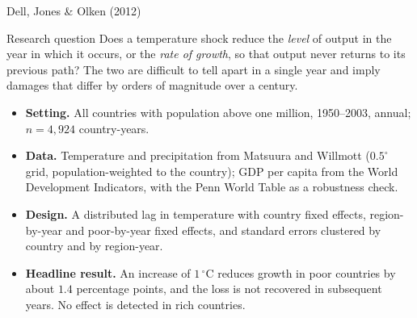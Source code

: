 \documentclass[aspectratio=169,10pt]{beamer}
\begin{document}
\begin{frame}{Dell, Jones \& Olken (2012)}
  \begin{block}{Research question}
    \small Does a temperature shock reduce the \emph{level} of output in the year in
    which it occurs, or the \emph{rate of growth}, so that output never returns to
    its previous path? The two are difficult to tell apart in a single year and
    imply damages that differ by orders of magnitude over a century.
  \end{block}
  \vspace{2pt}
  \small
  \begin{itemize}
    \item \textbf{Setting.} All countries with population above one million,
          1950--2003, annual; $n = 4{,}924$ country-years.
    \item \textbf{Data.} Temperature and precipitation from Matsuura and Willmott
          ($0.5^\circ$ grid, population-weighted to the country); GDP per capita from
          the World Development Indicators, with the Penn World Table as a
          robustness check.
    \item \textbf{Design.} A distributed lag in temperature with country fixed
          effects, region-by-year and poor-by-year fixed effects, and standard errors
          clustered by country and by region-year.
    \item \textbf{Headline result.} An increase of $1\,^\circ$C reduces growth in
          poor countries by about $1.4$ percentage points, and the loss is not
          recovered in subsequent years. No effect is detected in rich countries.
  \end{itemize}
\end{frame}
\end{document}
